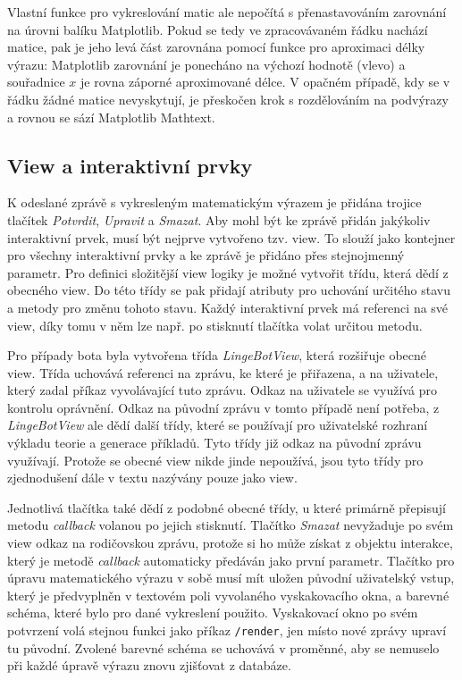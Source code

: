 \documentclass[FM]{tulthesis}
\begin{document}
	Vlastní funkce pro vykreslování matic ale nepočítá s přenastavováním zarovnání na úrovni balíku Matplotlib. Pokud se tedy ve zpracovávaném řádku nachází matice, pak je jeho levá část zarovnána pomocí funkce pro aproximaci délky výrazu: Matplotlib zarovnání je ponecháno na výchozí hodnotě (vlevo) a souřadnice $x$ je rovna záporné aproximované délce. V opačném případě, kdy se v řádku žádné \mbox{matice} nevyskytují, je přeskočen krok s rozdělováním na podvýrazy a rovnou se sází Matplotlib Mathtext.
	
	\subsection{View a interaktivní prvky}
	
	K odeslané zprávě s vykresleným matematickým výrazem je přidána trojice tlačítek \textit{Potvrdit}, \textit{Upravit} a \textit{Smazat}. Aby mohl být ke zprávě přidán jakýkoliv interaktivní prvek, musí být nejprve vytvořeno tzv. view. To slouží jako kontejner pro všechny interaktivní prvky a ke zprávě je přidáno přes stejnojmenný parametr. Pro definici složitější view logiky je možné vytvořit třídu, která dědí z obecného view. Do této třídy se pak přidají atributy pro uchování určitého stavu a metody pro změnu tohoto stavu. Každý interaktivní prvek má referenci na své view, díky tomu v něm lze např. po stisknutí tlačítka volat určitou metodu.
	
	Pro případy bota byla vytvořena třída \textit{LingeBotView}, která rozšiřuje obecné view. Třída uchovává referenci na zprávu, ke které je přiřazena, a na uživatele, který zadal příkaz vyvolávající tuto zprávu. Odkaz na uživatele se využívá pro kontrolu oprávnění. Odkaz na původní zprávu v tomto případě není potřeba, z \mbox{\textit{LingeBotView}} ale dědí další třídy, které se používají pro uživatelské rozhraní výkladu teorie a generace příkladů. Tyto třídy již odkaz na původní zprávu využívají. Protože se obecné view nikde jinde nepoužívá, jsou tyto třídy pro zjednodušení dále v textu nazývány pouze jako view. 
	
	Jednotlivá tlačítka také dědí z podobné obecné třídy, u které primárně přepisují metodu \textit{callback} volanou po jejich stisknutí. Tlačítko \textit{Smazat} nevyžaduje po svém view odkaz na rodičovskou zprávu, protože si ho může získat z objektu interakce, který je metodě \textit{callback} automaticky předáván jako první parametr. Tlačítko pro úpravu matematického výrazu v sobě musí mít uložen původní uživatelský vstup, který je předvyplněn v textovém poli vyvolaného vyskakovacího okna, a barevné schéma, které bylo pro dané vykreslení použito. Vyskakovací okno po svém potvrzení volá stejnou funkci jako příkaz \verb|/render|, jen místo nové zprávy upraví tu původní. Zvolené barevné schéma se uchovává v proměnné, aby se nemuselo při každé úpravě výrazu znovu zjišťovat z databáze.
			
\end{document}
